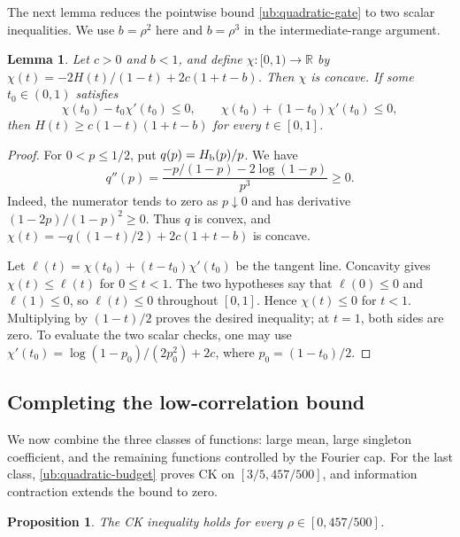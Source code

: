 \documentclass[11pt,letterpaper]{amsart}
\newcommand{\R}{\mathbb R}
\newcommand{\1}{\mathbf 1}
\newtheorem{lemma}[theorem]{Lemma}
\newtheorem{proposition}[theorem]{Proposition}
\numberwithin{equation}{section}
\begin{document}
The next lemma reduces the pointwise bound
\eqref{ub:quadratic-gate} to two scalar inequalities.
We use $b=\rho^2$ here and $b=\rho^3$ in the
intermediate-range argument.

\begin{lemma}\label{ub:tangent}
Let $c>0$ and $b<1$, and define $\chi:[0,1)\to\R$ by
$\chi(t)=-2H(t)/(1-t)+2c(1+t-b)$.
Then $\chi$ is concave.
If some $t_0\in(0,1)$ satisfies
\[
 \chi(t_0)-t_0\chi'(t_0)\le0,
 \qquad
 \chi(t_0)+(1-t_0)\chi'(t_0)\le0,
\]
then $H(t)\ge c(1-t)(1+t-b)$ for every $t\in[0,1]$.
\end{lemma}
\begin{proof}
For $0<p\le1/2$, put $q(p)=H_{\rm b}(p)/p$.
We have
\[
 q''(p)=\frac{-p/(1-p)-2\log(1-p)}{p^3}\ge0.
\]
Indeed, the numerator tends to zero as $p\downarrow0$
and has derivative $(1-2p)/(1-p)^2\ge0$.
Thus $q$ is convex, and
$\chi(t)=-q((1-t)/2)+2c(1+t-b)$ is concave.

Let $\ell(t)=\chi(t_0)+(t-t_0)\chi'(t_0)$ be the tangent line.
Concavity gives $\chi(t)\le\ell(t)$ for $0\le t<1$.
The two hypotheses say that $\ell(0)\le0$ and $\ell(1)\le0$,
so $\ell(t)\le0$ throughout $[0,1]$.
Hence $\chi(t)\le0$ for $t<1$.
Multiplying by $(1-t)/2$ proves the desired inequality;
at $t=1$, both sides are zero.
To evaluate the two scalar checks, one may use
$\chi'(t_0)=\log(1-p_0)/(2p_0^2)+2c$,
where $p_0=(1-t_0)/2$.
\end{proof}

\subsection{Completing the low-correlation bound}

We now combine the three classes of functions: large mean, large singleton
coefficient, and the remaining functions controlled by the Fourier cap.
For the last class, \eqref{ub:quadratic-budget} proves CK on
$[3/5,457/500]$, and information contraction extends the bound to zero.

\begin{proposition}\label{ub:lower-interval}
The CK inequality holds for every $\rho\in [0,457/500]$.
\end{proposition}
\end{document}
